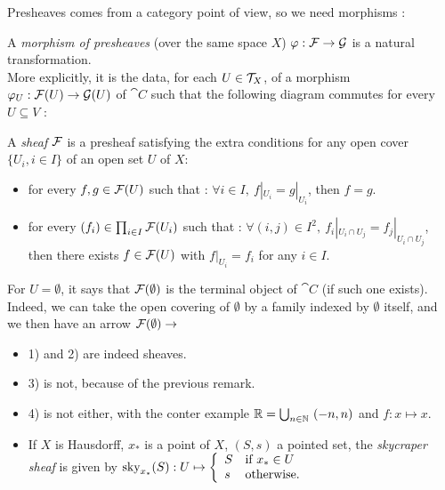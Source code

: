 Presheaves comes from a category point of view, so we need morphisms :

\begin{mydef}
A \textit{morphism of presheaves} (over the same space $X$) $\varphi : \mathcal{F} \to \mathcal{G}$ is a natural transformation.\\
More explicitly, it is the data, for each $U\in \mathcal{T}_X$, of a morphism $\varphi_U : \mathcal{F}(U) \to \mathcal{G}(U)$ of $\cat{C}$ such that the following diagram commutes for every $U \subseteq V$ :
\begin{center}
\end{center}
\end{mydef}


\begin{mydef}
A \textit{sheaf} $\mathcal{F}$ is a presheaf satisfying the extra conditions for any open cover $\{U_i,i\in I\}$ of an open set $U$ of $X$:
\begin{itemize}
\item[3.] for every $f,g \in \mathcal{F}(U)$ such that : $\forall i \in I,~ f|_{U_i} = g|_{U_i}$, then $f = g$.
\item[4.] for every $(f_i)\in \prod_{i\in I} \mathcal{F}(U_i)$ such that : $\forall (i,j)\in I^2,~ f_i|_{U_i \cap U_j}= f_j|_{U_i \cap U_j}$, then there exists $f\in\mathcal{F}(U)$ with $f|_{U_i} = f_i$ for any $i\in I$.
\end{itemize}
\end{mydef}


\begin{myrem}
For $U = \emptyset$, it says that $\mathcal{F}(\emptyset)$ is the terminal object of $\cat{C}$ (if such one exists). Indeed, we can take the open covering of $\emptyset$ by a family indexed by $\emptyset$ itself, and we then have an arrow $\mathcal{F}(\emptyset) \to $
\end{myrem}

\begin{myex}
\begin{itemize}
\item 1) and 2) are indeed sheaves.
\item 3) is not, because of the previous remark.
\item 4) is not either, with the conter example $\mathbb{R} = \bigcup_{n\in \mathbb{N}} ~(-n,n)$ and $f : x\mapsto x$.
\item If $X$ is Hausdorff, $x_*$ is a point of $X$, $(S,s)$ a pointed set, the \textit{skycraper sheaf} is given by $\text{sky}_{x_*}(S) : U \mapsto \left\lbrace
\begin{array}{l l}
S & \text{if } x_* \in U \\
s & \text{otherwise}.
\end{array}
\right.
$
\end{itemize}
\end{myex}

